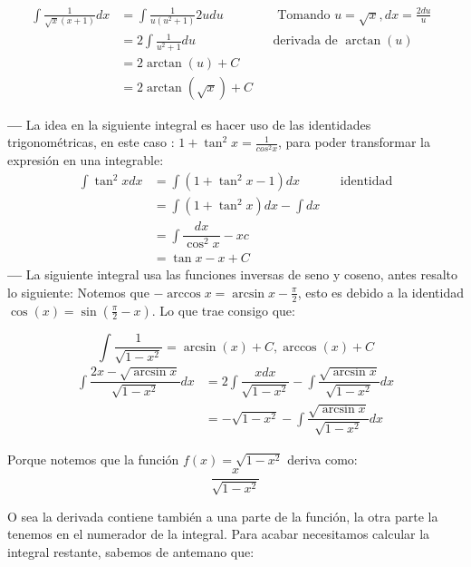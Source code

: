 \documentclass[14pt]{extarticle}
\begin{document}
            \begin{align}
                  \int \frac{1}{\sqrt{x}(x+1)} dx
                   & = \int \frac{1}{u(u^2+1)}2udu &  & \text{ Tomando $u = \sqrt{x}, dx = \frac{2du}{u} $ } \\
                   & =2 \int \frac{1}{u^2+1}du     &  & \text{derivada de $\arctan(u)$}                      \\
                   & = 2\arctan(u) + C                                                                       \\
                   & = 2\arctan(\sqrt{x}) + C
            \end{align}

    \textbf{---} La idea en la siguiente integral es hacer uso de las identidades trigonométricas, en este caso : $1+\tan^2{x} = \frac{1}{cos^2{x}}$, para poder transformar la expresión en una integrable:
            \begin{align}
                  \int \tan ^2xdx
                   & = \int (1+\tan ^2x-1)dx       &  & \text{identidad} \\
                   & = \int (1+\tan ^2x)dx-\int dx                       \\
                   & =\int\dfrac{dx}{\cos ^2x}-xc                        \\
                   & = \tan x-x+C
            \end{align}
    \textbf{---} La siguiente integral usa las funciones inversas de seno y coseno, antes resalto lo siguiente: Notemos que $-\arccos x = \arcsin x - \frac{\pi}{2}$, esto es debido a la identidad $\cos (x) = \sin(\frac{\pi}{2}-x)$. Lo que trae consigo que:

            $$\int \frac{1}{\sqrt{1-x^2}} = \arcsin(x) + C, \arccos(x)+C$$
            \begin{align}
                  \int\dfrac{2x-\sqrt{\arcsin x}}{\sqrt{1-x^2}}dx
                   & = 2\int\dfrac{xdx}{\sqrt{1-x^2}}-\int\dfrac{\sqrt{\arcsin x}}{\sqrt{1-x^2}}dx \\
                   & =-\sqrt{1-x^2}-\int\dfrac{\sqrt{\arcsin x}}{\sqrt{1-x^2}}dx
            \end{align}

            Porque notemos que la función $f(x) = \sqrt{1-x^2}$ deriva como: $$\frac{x}{\sqrt{1-x^2}}$$

            O sea la derivada contiene también a una parte de la función, la otra parte la tenemos en el numerador de la integral. Para acabar necesitamos calcular la integral restante, sabemos de antemano que:
\end{document}
